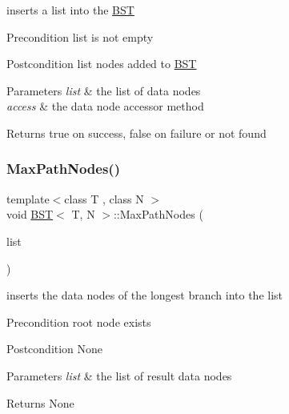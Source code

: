 inserts a list into the \hyperlink{class_b_s_t}{B\+ST} \begin{DoxyPrecond}{Precondition}
list is not empty 
\end{DoxyPrecond}
\begin{DoxyPostcond}{Postcondition}
list nodes added to \hyperlink{class_b_s_t}{B\+ST} 
\end{DoxyPostcond}

\begin{DoxyParams}{Parameters}
{\em list} & the list of data nodes \\
\hline
{\em access} & the data node accessor method \\
\hline
\end{DoxyParams}
\begin{DoxyReturn}{Returns}
true on success, false on failure or not found 
\end{DoxyReturn}
\mbox{\label{class_b_s_t_a8ef035f46b23dbe48acf2e23a755eb83}} 
\subsubsection{\texorpdfstring{Max\+Path\+Nodes()}{MaxPathNodes()}}
{\footnotesize\ttfamily template$<$class T , class N $>$ \\
void \hyperlink{class_b_s_t}{B\+ST}$<$ T, N $>$\+::Max\+Path\+Nodes (\begin{DoxyParamCaption}\item[{\hyperlink{class_list}{List}$<$ N $\ast$$>$ $\ast$}]{list }\end{DoxyParamCaption})}

inserts the data nodes of the longest branch into the list \begin{DoxyPrecond}{Precondition}
root node exists 
\end{DoxyPrecond}
\begin{DoxyPostcond}{Postcondition}
None 
\end{DoxyPostcond}

\begin{DoxyParams}{Parameters}
{\em list} & the list of result data nodes \\
\hline
\end{DoxyParams}
\begin{DoxyReturn}{Returns}
None 
\end{DoxyReturn}
\mbox{\label{class_b_s_t_a86fb81e20a21ef65e2b57e55d910d875}} 

